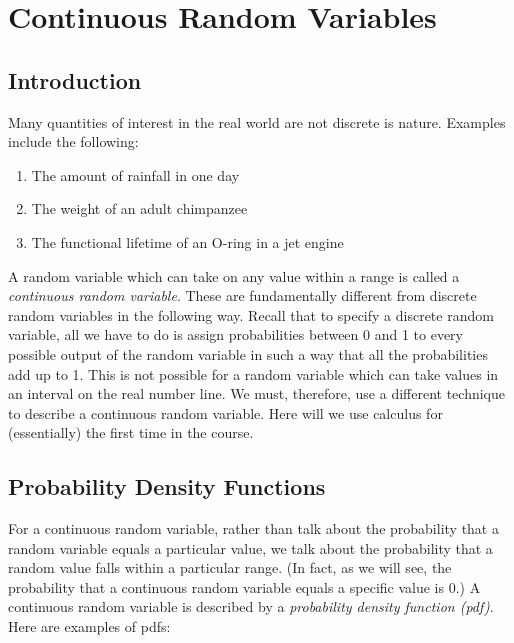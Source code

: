 \documentclass[12pt]{article}
\theoremstyle{definition}
\theoremstyle{remark}
\begin{document}
\setcounter{section}{2}
\section{Continuous Random Variables}

\subsection{Introduction}
Many quantities of interest in the real world are not discrete is nature. Examples include the following:
\begin{enumerate}
\item The amount of rainfall in one day
\item The weight of an adult chimpanzee
\item The functional lifetime of an O-ring in a jet engine
\end{enumerate}

A random variable which can take on any value within a range is called a \emph{continuous random variable}. These are fundamentally different from discrete random variables in the following way. Recall that to specify a discrete random variable, all we have to do is assign probabilities between 0 and 1 to every possible output of the random variable in such a way that all the probabilities add up to 1. This is not possible for a random variable which can take values in an interval on the real number line. We must, therefore, use a different technique to describe a continuous random variable. Here will we use calculus for (essentially) the first time in the course.

\subsection{Probability Density Functions}
For a continuous random variable, rather than talk about the probability that a random variable equals a particular value, we talk about the probability that a random value falls within a particular range. (In fact, as we will see, the probability that a continuous random variable equals a specific value is 0.) A continuous random variable is described by a \emph{probability density function (pdf)}. Here are examples of pdfs:
\end{document}

